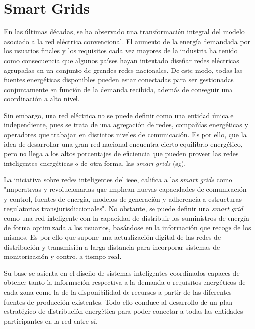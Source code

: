 \section{Smart Grids}
\label{sec:smartgrids}


En las últimas décadas, se ha observado una transformación integral del modelo asociado a la red eléctrica convencional. El aumento de la energía demandada por los usuarios finales y los requisitos cada vez mayores de la industria ha tenido como consecuencia que algunos países hayan intentado diseñar redes eléctricas agrupadas en un conjunto de grandes redes nacionales. De este modo, todas las fuentes energéticas disponibles pueden estar conectadas para ser gestionadas conjuntamente en función de la demanda recibida, además de conseguir una coordinación a alto nivel. \cite{smartgrid_overview}

\vspace{3mm}

Sin embargo, una red eléctrica no se puede definir como una entidad única e independiente, pues se trata de una agregación de redes, compañías energéticas y operadores que trabajan en distintos niveles de comunicación. Es por ello, que la idea de desarrollar una gran red nacional encuentra cierto equilibrio energético, pero no llega a los altos porcentajes de eficiencia que pueden proveer las redes inteligentes energéticas o de otra forma, las \textit{smart grids} (\gls{sg}). 

\vspace{3mm}

La iniciativa sobre redes inteligentes del \gls{ieee}, califica a las \textit{smart grids} \cite{ieee} como "imperativas y revolucionarias que implican nuevas capacidades de comunicación y control, fuentes de energía, modelos de generación y adherencia a estructuras regulatorias transjurisdiccionales". No obstante, se puede definir una \textit{smart grid} como una red inteligente con la capacidad de distribuir los suministros de energía de forma optimizada a los usuarios, basándose en la información que recoge de los mismos. Es por ello que supone una actualización digital de las redes de distribución y transmisión a larga distancia para incorporar sistemas de monitorización y control a tiempo real. \cite{iotfutura} 

\vspace{3mm}

Su base se asienta en el diseño de sistemas inteligentes coordinados capaces de obtener tanto la información respectiva a la demanda o requisitos energéticos de cada zona como la de la disponibilidad de recursos a partir de las diferentes fuentes de producción existentes. Todo ello conduce al desarrollo de un plan estratégico de distribución energética para poder conectar a todas las entidades participantes en la red entre sí. \cite{repsol}

